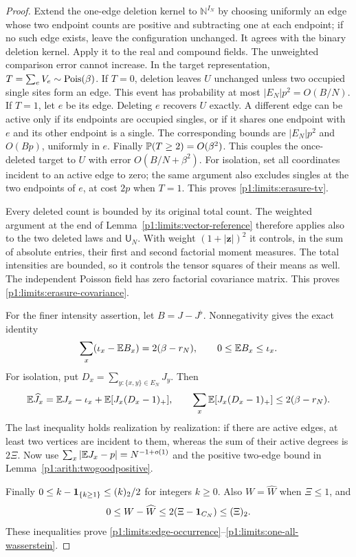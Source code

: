 \begin{proof}
Extend the one-edge deletion kernel to $\mathbb N^{I_N}$ by
choosing uniformly an edge whose two endpoint counts are positive
and subtracting one at each endpoint; if no such edge exists,
leave the configuration unchanged.  It agrees with the binary
deletion kernel.  Apply it to the real and compound fields.  The unweighted comparison error cannot increase.
In the target representation, $T=\sum_eV_e\sim\Pois(\beta)$.
If $T=0$, deletion leaves $U$ unchanged unless two occupied
single sites form an edge.  This event has probability at most
$|E_N|p^2=O(B/N)$.  If $T=1$, let $e$ be its edge.
Deleting $e$ recovers $U$ exactly.  A different edge can be
active only if its endpoints are occupied singles, or if it
shares one endpoint with $e$ and its other endpoint is a
single.  The corresponding bounds are $|E_N|p^2$ and
$O(Bp)$, uniformly in $e$.  Finally $\P(T\ge2)=O(\beta^2)$.
This couples the once-deleted target to $U$ with error
$O(B/N+\beta^2)$.  For isolation, set all coordinates incident
to an active edge to zero; the same argument also excludes
singles at the two endpoints of $e$, at cost $2p$ when
$T=1$.  This proves \eqref{p1:limits:erasure-tv}.

Every deleted count is bounded by its original total count.
The weighted argument at the end of
Lemma~\ref{p1:limits:vector-reference} therefore applies also
to the two deleted laws and $\mathsf U_N$.  With weight
$(1+|\boldsymbol z|)^2$ it controls, in the sum of absolute
entries, their first and second factorial moment measures.
The total intensities are bounded, so it controls the tensor
squares of their means as well.  The independent Poisson field
has zero factorial covariance matrix.  This proves
\eqref{p1:limits:erasure-covariance}.

For the finer intensity assertion, let $B=J-J^\flat$.
Nonnegativity gives the exact identity
\[
 \sum_x(\iota_x-\E B_x)=2(\beta-r_N),\qquad
 0\le\E B_x\le \iota_x.
\]
For isolation, put $D_x=\sum_{y:\{x,y\}\in E_N}J_y$.
Then
\[
 \E\widehat J_x=\E J_x-\iota_x+
       \E[J_x(D_x-1)_+],\qquad
 \sum_x\E[J_x(D_x-1)_+]\le2(\beta-r_N).
\]
The last inequality holds realization by realization: if there
are active edges, at least two vertices are incident to them,
whereas the sum of their active degrees is $2\Xi$.
Now use $\sum_x|\E J_x-p|=N^{-1+o(1)}$ and the positive
two-edge bound in Lemma~\ref{p1:arith:twogoodpositive}.

Finally $0\le k-\ind_{\{k\ge1\}}\le(k)_2/2$ for integers
$k\ge0$.  Also $W=\widehat W$ when $\Xi\le1$, and
\[
 0\le W-\widehat W\le2(\Xi-\ind_{C_N})\le(\Xi)_2.
\]
These inequalities prove
\eqref{p1:limits:edge-occurrence}--\eqref{p1:limits:one-all-wasserstein}.
\end{proof}

